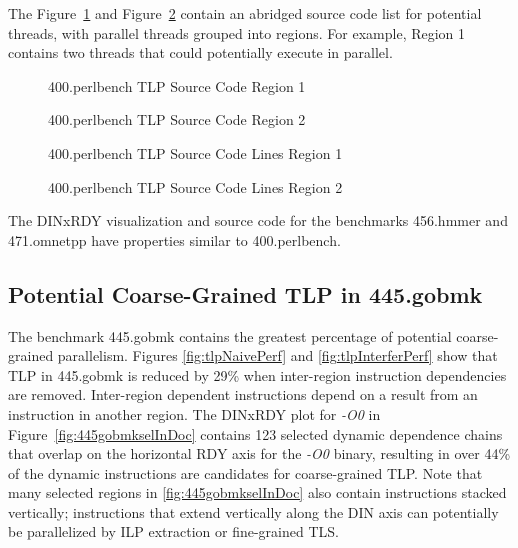 \documentclass[defaultstyle,11pt]{thesis}
\begin{document}
The Figure~\ref{fig:400perlsrcR1} and
Figure~\ref{fig:400perlsrcR2} contain an abridged source code list for
potential threads, with parallel threads grouped into regions.  For
example, Region 1 contains two threads that could potentially execute
in parallel.

\begin{figure}
  \centering
  \subfigure[Thread 1]{{\small }}
  \subfigure[Thread 2]{{\small }}
  \caption{400.perlbench TLP Source Code Region 1}
  \label{fig:400perlsrcR1}
\end{figure}

\begin{figure}
  \centering
  \subfigure[Thread 1]{{\small }}
  \hspace{4mm}
  \subfigure[Thread 2]{{\small }}
  \caption{400.perlbench TLP Source Code Region 2}
  \label{fig:400perlsrcR2}
\end{figure}

\begin{figure}
  \centering
  \subfigure[Thread 1]{{\small }}
  \hspace{4mm}
  \subfigure[Thread 2]{{\small }}
  \caption{400.perlbench TLP Source Code Lines Region 1}
  \label{fig:400perlsrcLinesR1}
\end{figure}

\begin{figure}
  \centering
  \subfigure[Thread 1]{{\tiny }}
  \hspace{4mm}
  \subfigure[Thread 2]{{\tiny }}
  \caption{400.perlbench TLP Source Code Lines Region 2}
  \label{fig:400perlsrcLinesR2}
\end{figure}

The DINxRDY visualization and source code for the benchmarks 456.hmmer
and 471.omnetpp have properties similar to 400.perlbench.

\subsection{Potential Coarse-Grained TLP in 445.gobmk}

The benchmark 445.gobmk contains the greatest percentage of potential
coarse-grained parallelism. Figures \ref{fig:tlpNaivePerf} and
\ref{fig:tlpInterferPerf} show that TLP in 445.gobmk is reduced by
29\% when inter-region instruction dependencies are removed.
Inter-region dependent instructions depend on a result from an
instruction in another region.  The DINxRDY plot for \textit{-O0} in
Figure~\ref{fig:445gobmkselInDoc} contains 123 selected dynamic dependence
chains that overlap on the horizontal RDY axis for the \textit{-O0}
binary, resulting in over 44\% of the dynamic instructions are
candidates for coarse-grained TLP.  Note that many selected regions in
\ref{fig:445gobmkselInDoc} also contain instructions stacked vertically;
instructions that extend vertically along the DIN axis can potentially
be parallelized by ILP extraction or fine-grained TLS.
\end{document}
